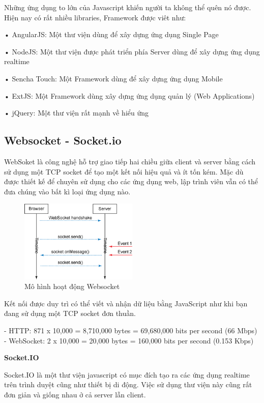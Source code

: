 Những ứng dụng to lớn của Javascript khiến người ta không thể quên nó được. Hiện nay có rất nhiều libraries, Framework được viêt như:

• AngularJS: Một thư viện dùng để xây dựng ứng dụng Single Page

• NodeJS: Một thư viện được phát triển phía Server dùng để xây dựng ứng dụng realtime

• Sencha Touch: Một Framework  dùng để xây dựng ứng dụng Mobile

• ExtJS: Một Framework dùng xây dựng ứng dụng quản lý (Web Applications)

• jQuery: Một thư viện rất mạnh về hiểu ứng

\subsection{Websocket - Socket.io}
WebSoket là công nghệ hỗ trợ giao tiếp hai chiều giữa client và server bằng cách sử dụng một TCP socket để tạo một kết nối hiệu quả và ít tốn kém. Mặc dù được thiết kế để chuyên sử dụng cho các ứng dụng web, lập trình viên vẫn có thể đưa chúng vào bất kì loại ứng dụng nào.
\begin{figure}[H]
	\centering    
	\includegraphics[width=0.5\textwidth]{websk}
	\caption[Mô hình hoạt động Websocket]{Mô hình hoạt động Websocket}
	\label{fig: websk}
\end{figure}

Kết nối được duy trì có thể viết và nhận dữ liệu bằng JavaScript như khi bạn đang sử dụng một TCP socket đơn thuần.

- HTTP: 871 x 10,000 = 8,710,000 bytes = 69,680,000 bits per second (66 Mbps)
- WebSocket: 2 x 10,000 = 20,000 bytes = 160,000 bits per second (0.153 Kbps)


\textbf{Socket.IO}

Socket.IO là một thư viện javascript có mục đích tạo ra các ứng dụng realtime trên trình duyệt cũng như thiết bị di động. Việc sử dụng thư viện này cũng rất đơn giản và giống nhau ở cả server lẫn client. 

